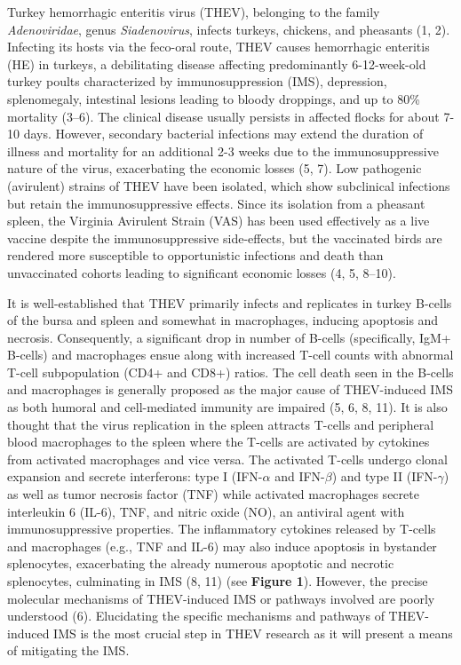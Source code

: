 \documentclass[
]{article}
\begin{document}
Turkey hemorrhagic enteritis virus (THEV), belonging to the family
\emph{Adenoviridae}, genus \emph{Siadenovirus}, infects turkeys,
chickens, and pheasants (1, 2). Infecting its hosts via the feco-oral
route, THEV causes hemorrhagic enteritis (HE) in turkeys, a debilitating
disease affecting predominantly 6-12-week-old turkey poults
characterized by immunosuppression (IMS), depression, splenomegaly,
intestinal lesions leading to bloody droppings, and up to 80\% mortality
(3--6). The clinical disease usually persists in affected flocks for
about 7-10 days. However, secondary bacterial infections may extend the
duration of illness and mortality for an additional 2-3 weeks due to the
immunosuppressive nature of the virus, exacerbating the economic losses
(5, 7). Low pathogenic (avirulent) strains of THEV have been isolated,
which show subclinical infections but retain the immunosuppressive
effects. Since its isolation from a pheasant spleen, the Virginia
Avirulent Strain (VAS) has been used effectively as a live vaccine
despite the immunosuppressive side-effects, but the vaccinated birds are
rendered more susceptible to opportunistic infections and death than
unvaccinated cohorts leading to significant economic losses (4, 5,
8--10).

It is well-established that THEV primarily infects and replicates in
turkey B-cells of the bursa and spleen and somewhat in macrophages,
inducing apoptosis and necrosis. Consequently, a significant drop in
number of B-cells (specifically, IgM+ B-cells) and macrophages ensue
along with increased T-cell counts with abnormal T-cell subpopulation
(CD4+ and CD8+) ratios. The cell death seen in the B-cells and
macrophages is generally proposed as the major cause of THEV-induced IMS
as both humoral and cell-mediated immunity are impaired (5, 6, 8, 11).
It is also thought that the virus replication in the spleen attracts
T-cells and peripheral blood macrophages to the spleen where the T-cells
are activated by cytokines from activated macrophages and vice versa.
The activated T-cells undergo clonal expansion and secrete interferons:
type I (IFN-\(\alpha\) and IFN-\(\beta\)) and type II (IFN-\(\gamma\))
as well as tumor necrosis factor (TNF) while activated macrophages
secrete interleukin 6 (IL-6), TNF, and nitric oxide (NO), an antiviral
agent with immunosuppressive properties. The inflammatory cytokines
released by T-cells and macrophages (e.g., TNF and IL-6) may also induce
apoptosis in bystander splenocytes, exacerbating the already numerous
apoptotic and necrotic splenocytes, culminating in IMS (8, 11) (see
\textbf{Figure 1}). However, the precise molecular mechanisms of
THEV-induced IMS or pathways involved are poorly understood (6).
Elucidating the specific mechanisms and pathways of THEV-induced IMS is
the most crucial step in THEV research as it will present a means of
mitigating the IMS.
\end{document}
